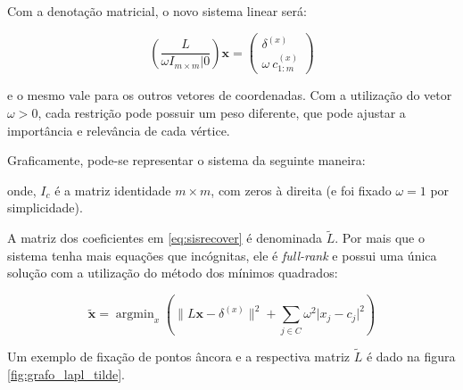 Com a denotação matricial, o novo sistema linear será:

\begin{equation}\label{eq:sisrecover}
	\left( \frac{L}{\omega I_{m \times m} | 0} \right) \mathbf{x} = \begin{pmatrix}
		\delta^{(x)}\\
		\omega\ c_{1:m}^{(x)}
	\end{pmatrix}
\end{equation}

\noindent e o mesmo vale para os outros vetores de coordenadas. Com a utilização do vetor $\omega > 0$, cada restrição pode possuir um peso diferente, que pode ajustar a importância e relevância de cada vértice.

Graficamente, pode-se representar o sistema da seguinte maneira: 

\begin{center}
\end{center}

\noindent onde, $I_c$ é a matriz identidade $m \times m$, com zeros à direita (e foi fixado $\omega = 1$ por simplicidade).

A matriz dos coeficientes em \ref{eq:sisrecover} é denominada $\tilde{L}$. Por mais que o sistema tenha mais equações que incógnitas, ele é \textit{full-rank} e possui uma única solução com a utilização do método dos mínimos quadrados:

\begin{equation}\label{eq:leastsqrsol}
	\mathbf{\tilde{x}} = \mathop{\mathrm{argmin}}_x \left( \lVert L \mathbf{x} - \delta^{(x)} \rVert^2 + \sum_{j \in C} \omega^2 \lvert x_j - c_j \rvert^2  \right)
\end{equation}

Um exemplo de fixação de pontos âncora e a respectiva matriz $\tilde{L}$ é dado na figura \ref{fig:grafo_lapl_tilde}.

